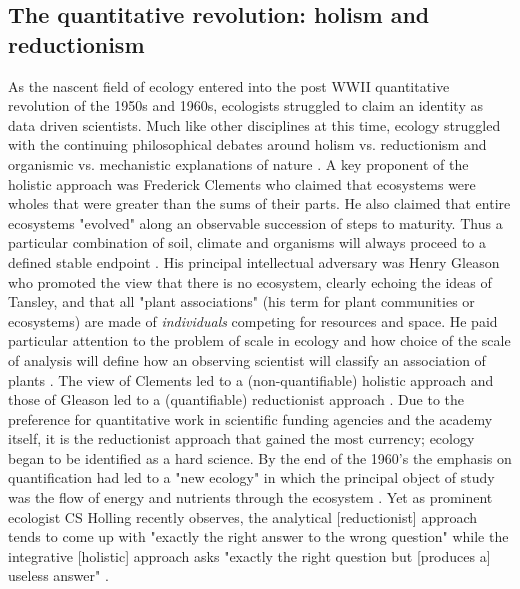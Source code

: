 \subsection{The quantitative revolution: holism and reductionism}
As the nascent field of ecology entered into the post WWII quantitative revolution of the 1950s and 1960s, ecologists struggled to claim an identity as data driven scientists. Much like other disciplines at this time, ecology struggled with the continuing philosophical debates around holism vs. reductionism and organismic vs. mechanistic explanations of nature \cite{barbour_1996}. A key proponent of the holistic approach was Frederick Clements who claimed that ecosystems were wholes that were greater than the sums of their parts. He also claimed that entire ecosystems "evolved" along an observable succession of steps to maturity. Thus a particular combination of soil, climate and organisms will always proceed to a defined stable endpoint \cite{clements_1936}. His principal intellectual adversary was Henry Gleason who promoted the view that there is no ecosystem, clearly echoing the ideas of Tansley, and that all "plant associations" (his term for plant communities or ecosystems) are made of \textit{individuals} competing for resources and space. He paid particular attention to the problem of scale in ecology and how choice of the scale of analysis will define how an observing scientist will classify an association of plants \cite{gleason_1939}. The view of Clements led to a (non-quantifiable) holistic approach and those of Gleason led to a (quantifiable) reductionist approach \cite{barbour_1996,worster_1977}. Due to the preference for quantitative work in scientific funding agencies and the academy itself, it is the reductionist approach that gained the most currency; ecology began to be identified as a hard science. By the end of the 1960's the emphasis on quantification had led to a "new ecology" in which the principal object of study was the flow of energy and nutrients through the ecosystem \cite{worster_1977, barbour_1996}.  Yet as prominent ecologist CS Holling recently observes, the analytical [reductionist] approach tends to come up with "exactly the right answer to the wrong question" while the integrative [holistic] approach asks "exactly the right question but [produces a] useless answer" \cite[][p. 3]{holling_1998}.

